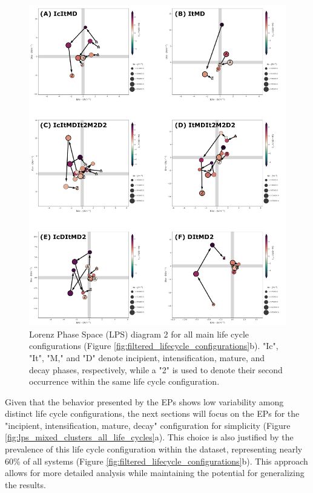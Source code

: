 \begin{figure}[!htbp]
\centering
\includegraphics[width=\textwidth]{figs_6/lps_imports_clusters_all_life_cycles.pdf}
\caption[LPS 2 - Clusters - All Life Cycle Configurations]{Lorenz Phase Space (LPS) diagram 2 for all main life cycle configurations (Figure \ref{fig:filtered_lifecycle_configurations}b). "Ic", "It", "M," and "D" denote incipient, intensification, mature, and decay phases, respectively, while a "2" is used to denote their second occurrence within the same life cycle configuration.}
\label{fig:lps_imports_all_systems_zoom}
\end{figure}

Given that the behavior presented by the EPs shows low variability among distinct life cycle configurations, the next sections will focus on the EPs for the "incipient, intensification, mature, decay" configuration for simplicity (Figure \ref{fig:lps_mixed_clusters_all_life_cycles}a). This choice is also justified by the prevalence of this life cycle configuration within the dataset, representing nearly 60\% of all systems (Figure \ref{fig:filtered_lifecycle_configurations}b). This approach allows for more detailed analysis while maintaining the potential for generalizing the results.

